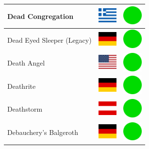 \documentclass[12pt, a4paper, twoside]{report}
\begin{document}
\begin{center}
\begin{longtable}{|p{5cm}|p{2cm}|p{2cm}|}
Dead Congregation & \includegraphics[width=1cm]{4x3/gr} & \includegraphics[width=1cm]{likes/y} \\ \hline
Dead Eyed Sleeper (Legacy) & \includegraphics[width=1cm]{4x3/de} & \includegraphics[width=1cm]{likes/y} \\ \hline
Death Angel & \includegraphics[width=1cm]{4x3/us} & \includegraphics[width=1cm]{likes/y} \\ \hline
Deathrite & \includegraphics[width=1cm]{4x3/de} & \includegraphics[width=1cm]{likes/y} \\ \hline
Deathstorm & \includegraphics[width=1cm]{4x3/at} & \includegraphics[width=1cm]{likes/y} \\ \hline
Debauchery's Balgeroth & \includegraphics[width=1cm]{4x3/de} & \includegraphics[width=1cm]{likes/y} \\ \hline

\end{longtable}
\end{center}
\end{document}
